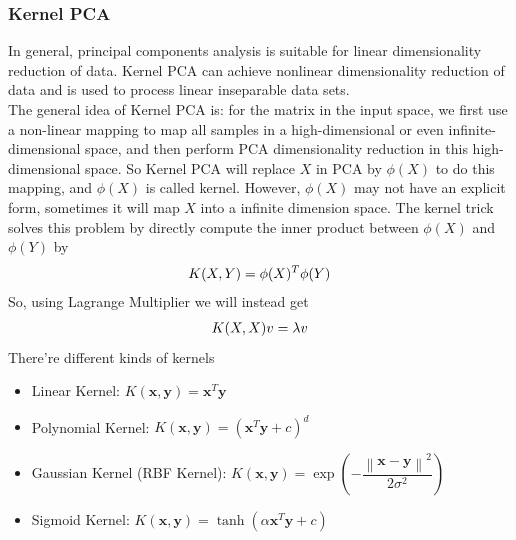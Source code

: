 \documentclass{article}
\begin{document}
\subsubsection{Kernel PCA}
\indent In general, principal components analysis is suitable for linear dimensionality reduction of data. Kernel PCA can achieve nonlinear dimensionality reduction of data and is used to process linear inseparable data sets.\\
\indent The general idea of Kernel PCA is: for the matrix in the input space, we first use a non-linear mapping to map all samples in a high-dimensional or even infinite-dimensional space, and then perform PCA dimensionality reduction in this high-dimensional space.
So Kernel PCA will replace $X$ in PCA by $\phi(X)$ to do this mapping, and $\phi(X)$ is called kernel. However, $\phi(X)$ may not have an explicit form, sometimes it will map $X$ into a infinite dimension space. The kernel trick solves this problem by directly compute the inner product between $\phi(X)$ and $\phi(Y)$ by
\begin{eqnarray}
\centering
K(X, Y) = \phi(X)^{T}\phi(Y)
\end{eqnarray}
So, using Lagrange Multiplier we will instead get
\begin{eqnarray}
\centering
K(X, X)v=\lambda v
\end{eqnarray}
There're different kinds of kernels
\begin{itemize}
	\item Linear Kernel: $K(\boldsymbol{x}, \boldsymbol{y})=\boldsymbol{x}^{T}\boldsymbol{y}$
	\item Polynomial Kernel: $K(\boldsymbol{x}, \boldsymbol{y})=(\boldsymbol{x}^{T}\boldsymbol{y}+c)^d$
	\item Gaussian Kernel (RBF Kernel): $K(\boldsymbol{x},\boldsymbol{y})=\exp(-\dfrac{\left\| \boldsymbol{x}-\boldsymbol{y}\right\|^2}{2\sigma^2})$
	\item Sigmoid Kernel: $K(\boldsymbol{x},\boldsymbol{y})=\tanh(\alpha \boldsymbol{x}^{T}\boldsymbol{y}+c)$
\end{itemize}
\end{document}

